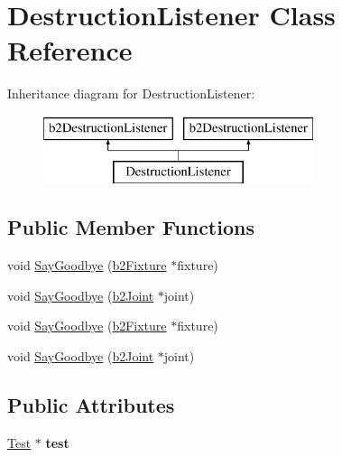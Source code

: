 \hypertarget{class_destruction_listener}{\section{Destruction\-Listener Class Reference}
\label{class_destruction_listener}
}
Inheritance diagram for Destruction\-Listener\-:\begin{figure}[H]
\begin{center}
\leavevmode
\includegraphics[height=2.000000cm]{class_destruction_listener}
\end{center}
\end{figure}
\subsection*{Public Member Functions}
\begin{DoxyCompactItemize}
\item 
void \hyperlink{class_destruction_listener_a51b3b045b48c33fbfaa0182b329d5d49}{Say\-Goodbye} (\hyperlink{classb2_fixture}{b2\-Fixture} $\ast$fixture)
\item 
void \hyperlink{class_destruction_listener_a55627bd55b8816d66e0f3d85a75c0552}{Say\-Goodbye} (\hyperlink{classb2_joint}{b2\-Joint} $\ast$joint)
\item 
void \hyperlink{class_destruction_listener_a51b3b045b48c33fbfaa0182b329d5d49}{Say\-Goodbye} (\hyperlink{classb2_fixture}{b2\-Fixture} $\ast$fixture)
\item 
void \hyperlink{class_destruction_listener_a55627bd55b8816d66e0f3d85a75c0552}{Say\-Goodbye} (\hyperlink{classb2_joint}{b2\-Joint} $\ast$joint)
\end{DoxyCompactItemize}
\subsection*{Public Attributes}
\begin{DoxyCompactItemize}
\item 
\hypertarget{class_destruction_listener_a63bed410135cb56d7d40d3c05a9b20c2}{\hyperlink{class_test}{Test} $\ast$ {\bfseries test}}\label{class_destruction_listener_a63bed410135cb56d7d40d3c05a9b20c2}

\end{DoxyCompactItemize}


